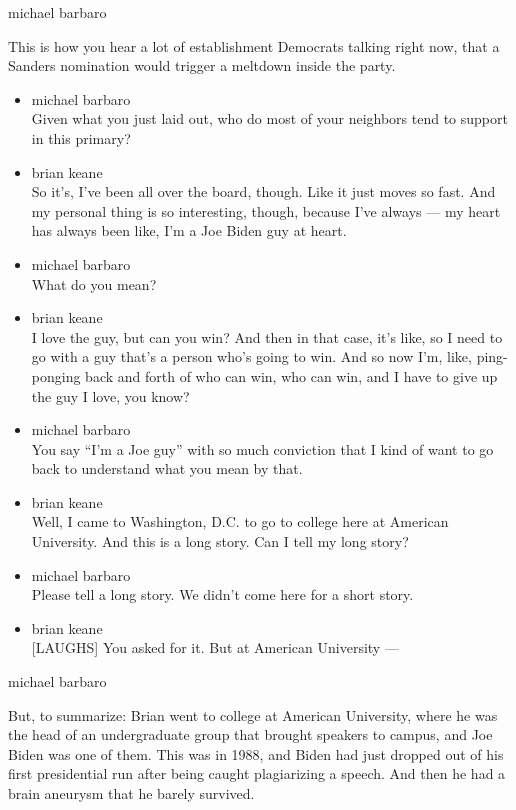 michael barbaro

This is how you hear a lot of establishment Democrats talking right now,
that a Sanders nomination would trigger a meltdown inside the party.

\begin{itemize}
\item
  michael barbaro\\
  Given what you just laid out, who do most of your neighbors tend to
  support in this primary?
\item
  brian keane\\
  So it's, I've been all over the board, though. Like it just moves so
  fast. And my personal thing is so interesting, though, because I've
  always --- my heart has always been like, I'm a Joe Biden guy at
  heart.
\item
  michael barbaro\\
  What do you mean?
\item
  brian keane\\
  I love the guy, but can you win? And then in that case, it's like, so
  I need to go with a guy that's a person who's going to win. And so now
  I'm, like, ping-ponging back and forth of who can win, who can win,
  and I have to give up the guy I love, you know?
\item
  michael barbaro\\
  You say ``I'm a Joe guy'' with so much conviction that I kind of want
  to go back to understand what you mean by that.
\item
  brian keane\\
  Well, I came to Washington, D.C. to go to college here at American
  University. And this is a long story. Can I tell my long story?
\item
  michael barbaro\\
  Please tell a long story. We didn't come here for a short story.
\item
  brian keane\\
  {[}LAUGHS{]} You asked for it. But at American University ---
\end{itemize}

michael barbaro

But, to summarize: Brian went to college at American University, where
he was the head of an undergraduate group that brought speakers to
campus, and Joe Biden was one of them. This was in 1988, and Biden had
just dropped out of his first presidential run after being caught
plagiarizing a speech. And then he had a brain aneurysm that he barely
survived.

